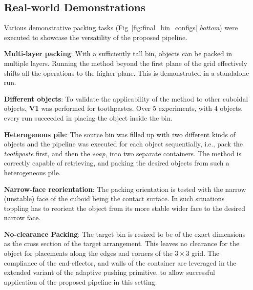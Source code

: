 \subsection{Real-world Demonstrations}

Various demonstrative packing tasks (Fig~\ref{fig:final_bin_configs} \textit{bottom}) were executed to showcase the versatility of the proposed pipeline.

\noindent\textbf{Multi-layer packing}: With a sufficiently tall bin, objects can be packed in multiple layers. Running the method beyond the first plane of the grid effectively shifts all the operations to the higher plane. This is demonstrated in a standalone run.

\noindent\textbf{Different objects}: To validate the applicability of the method to other cuboidal objects, \textbf{V1} was performed for toothpastes. Over $5$ experiments,  with $4$ objects, every run succeeded in placing the object inside the bin.

\noindent\textbf{Heterogenous pile}: The source bin was filled up with two different kinds of objects and the pipeline was executed for each object sequentially, i.e., pack the \textit{toothpaste} first, and then the \textit{soap}, into two separate containers. The method is correctly capable of retrieving, and packing the desired objects from such a heterogeneous pile.

\noindent\textbf{Narrow-face reorientation}: The packing orientation is tested with the narrow (unstable) face of the cuboid being the contact surface. In such situations toppling has to reorient the object from its more stable wider face to the desired narrow face. 

\noindent\textbf{No-clearance Packing}: The target bin is resized to be of the exact dimensions as the cross section of the target arrangement. This leaves no clearance for the object for placements along the edges and corners of the $3\times 3$ grid. The compliance of the end-effector, and walls of the container are leveraged in the extended variant of the adaptive pushing primitive, to allow successful application of the proposed pipeline in this setting.

